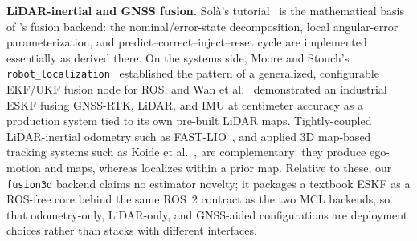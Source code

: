 \textbf{LiDAR-inertial and GNSS fusion.}
Sol\`a's tutorial~\cite{sola2017quaternion} is the mathematical basis
of \prismloc's fusion backend: the nominal/error-state
decomposition, local angular-error parameterization, and
predict--correct--inject--reset cycle are implemented essentially as
derived there. On the systems side, Moore and
Stouch's \texttt{robot\_localization}~\cite{moore2014generalized}
established the pattern of a generalized, configurable EKF/UKF fusion
node for ROS, and Wan et al.~\cite{wan2018robust} demonstrated an
industrial ESKF fusing GNSS-RTK, LiDAR, and IMU at centimeter accuracy
as a production system tied to its own pre-built LiDAR maps.
Tightly-coupled LiDAR-inertial
odometry such as FAST-LIO~\cite{xu2021fastlio}, and applied 3D
map-based tracking systems such as Koide et
al.~\cite{koide2019portable}, are complementary: they produce
ego-motion and maps, whereas \prismloc{} localizes within a
prior map. Relative to these, our \texttt{fusion3d} backend claims no
estimator novelty; it packages a textbook ESKF as a ROS-free core
behind the same ROS~2 contract as the two MCL backends, so that
odometry-only, LiDAR-only, and GNSS-aided configurations are
deployment choices rather than stacks with different interfaces.

